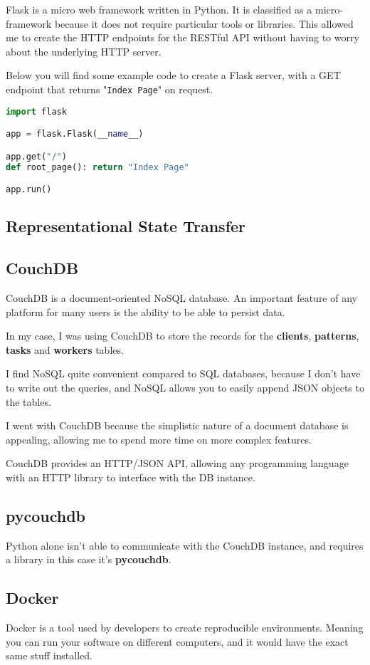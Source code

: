 Flask is a micro web framework written in Python.
It is classified as a micro-framework because it does
not require particular tools or libraries.
This allowed me to create the HTTP endpoints for the RESTful API without
having to worry about the underlying HTTP server.

Below you will find some example code to create a Flask server,
with a GET endpoint that returns "\texttt{Index Page}" on request.

\begin{lstlisting}[language=Python]
import flask

app = flask.Flask(__name__)

app.get("/")
def root_page(): return "Index Page"

app.run()
\end{lstlisting}

\subsection{Representational State Transfer}

\subsection{CouchDB}
CouchDB is a document-oriented NoSQL database.
An important feature of any platform for many users is the
ability to be able to persist data.

In my case, I was using CouchDB to store the records for the
\textbf{clients}, \textbf{patterns}, \textbf{tasks} and \textbf{workers} tables.

I find NoSQL quite convenient compared to SQL databases,
because I don't have to write out the queries,
and NoSQL allows you to easily append JSON objects to the tables.

I went with CouchDB because the simplistic nature of a document database is appealing,
allowing me to spend more time on more complex features.

CouchDB provides an HTTP/JSON API, allowing any programming language
with an HTTP library to interface with the DB instance.

\subsection{pycouchdb}
Python alone isn't able to communicate with the CouchDB instance,
and requires a library in this case it's \textbf{pycouchdb}.

\subsection{Docker}
Docker is a tool used by developers to create reproducible environments.
Meaning you can run your software on different computers,
and it would have the exact same stuff installed.

